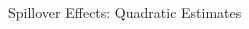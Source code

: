 \documentclass[14pt, aspectratio=169]{beamer}
\begin{document}
 
\begin{frame}{Spillover Effects: Quadratic Estimates}
\begin{columns}[T] %
 \begin{column}{.45\textwidth}
  \end{column}%
  \hspace{2.5ex}
  \begin{column}{.45\textwidth}
  \makebox[\linewidth][l]{
    \resizebox{\linewidth}{!}{
}}
\end{column}
\end{columns}
\end{frame}
\end{document}
